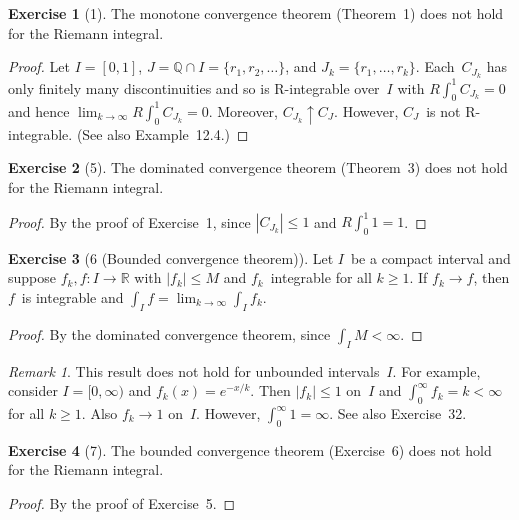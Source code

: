 \documentclass[letterpaper,12pt]{article}
\newcommand{\Q}{\mathbb{Q}}
\newcommand{\R}{\mathbb{R}}
\newcommand{\upto}{\uparrow}
\newcommand{\sect}{\cap}
\newcommand{\Rint}{R\!\int}
\newcommand{\abs}[1]{|{#1}|}
\theoremstyle{plain}
\theoremstyle{definition}
\newtheorem*{exer}{Exercise}
\theoremstyle{remark}
\newtheorem*{rmk}{Remark}
\begin{document}
\begin{exer}[1]
The monotone convergence theorem (Theorem~1) does not hold for the Riemann integral.
\end{exer}
\begin{proof}
Let \(I=[0,1]\), \(J=\Q\sect I=\{r_1,r_2,\ldots\}\), and \(J_k=\{r_1,\ldots,r_k\}\). Each~\(C_{J_k}\) has only finitely many discontinuities and so is R-integrable over~\(I\) with \(\Rint_0^1 C_{J_k}=0\) and hence \(\lim_{k\to\infty}\Rint_0^1 C_{J_k}=0\). Moreover, \(C_{J_k}\upto C_J\). However, \(C_J\)~is not R-integrable. (See also Example~12.4.)
\end{proof}

\begin{exer}[5]
The dominated convergence theorem (Theorem~3) does not hold for the Riemann integral.
\end{exer}
\begin{proof}
By the proof of Exercise~1, since \(\abs{C_{J_k}}\le 1\) and \(\Rint_0^1 1=1\).
\end{proof}

\begin{exer}[6 (Bounded convergence theorem)]
Let \(I\)~be a compact interval and suppose \(f_k,f:I\to\R\) with \(\abs{f_k}\le M\) and \(f_k\)~integrable for all \(k\ge1\). If \(f_k\to f\), then \(f\)~is integrable and \(\int_I f=\lim_{k\to\infty}\int_I f_k\).
\end{exer}
\begin{proof}
By the dominated convergence theorem, since \(\int_I M<\infty\).
\end{proof}
\begin{rmk}
This result does not hold for unbounded intervals~\(I\). For example, consider \(I=[0,\infty)\) and \(f_k(x)=e^{-x/k}\). Then \(\abs{f_k}\le 1\) on~\(I\) and \(\int_0^\infty f_k=k<\infty\) for all \(k\ge 1\). Also \(f_k\to 1\) on~\(I\). However, \(\int_0^\infty 1=\infty\). See also Exercise~32.
\end{rmk}

\begin{exer}[7]
The bounded convergence theorem (Exercise~6) does not hold for the Riemann integral.
\end{exer}
\begin{proof}
By the proof of Exercise~5.
\end{proof}
\end{document}
